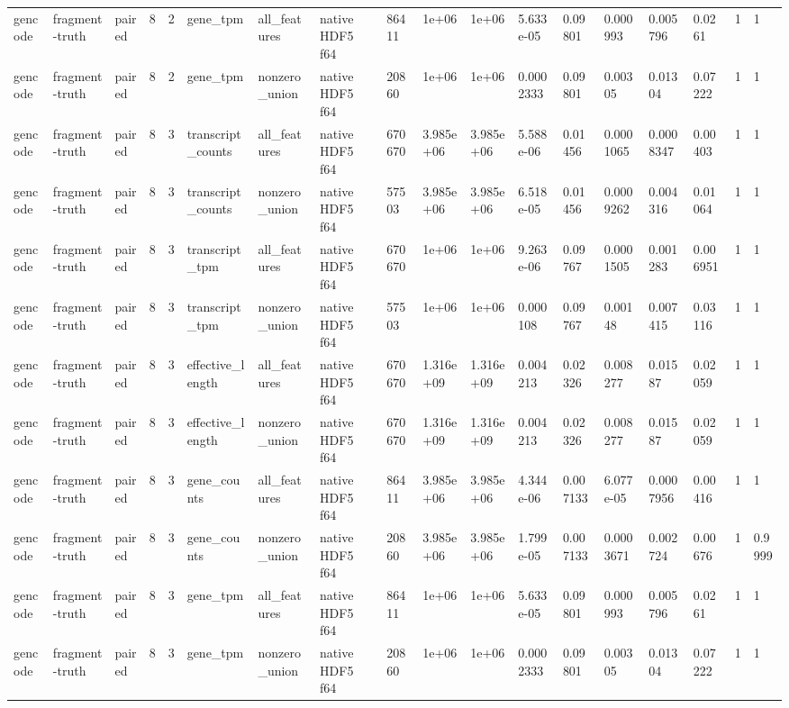 \begin{tabular}{llllllllllllllllll}
gencode & fragment-truth & paired & 8 & 2 & gene\_tpm & all\_features & native HDF5 f64 & 86411 & 1e+06 & 1e+06 & 5.633e-05 & 0.09801 & 0.000993 & 0.005796 & 0.0261 & 1 & 1 \\
gencode & fragment-truth & paired & 8 & 2 & gene\_tpm & nonzero\_union & native HDF5 f64 & 20860 & 1e+06 & 1e+06 & 0.0002333 & 0.09801 & 0.00305 & 0.01304 & 0.07222 & 1 & 1 \\
gencode & fragment-truth & paired & 8 & 3 & transcript\_counts & all\_features & native HDF5 f64 & 670670 & 3.985e+06 & 3.985e+06 & 5.588e-06 & 0.01456 & 0.0001065 & 0.0008347 & 0.00403 & 1 & 1 \\
gencode & fragment-truth & paired & 8 & 3 & transcript\_counts & nonzero\_union & native HDF5 f64 & 57503 & 3.985e+06 & 3.985e+06 & 6.518e-05 & 0.01456 & 0.0009262 & 0.004316 & 0.01064 & 1 & 1 \\
gencode & fragment-truth & paired & 8 & 3 & transcript\_tpm & all\_features & native HDF5 f64 & 670670 & 1e+06 & 1e+06 & 9.263e-06 & 0.09767 & 0.0001505 & 0.001283 & 0.006951 & 1 & 1 \\
gencode & fragment-truth & paired & 8 & 3 & transcript\_tpm & nonzero\_union & native HDF5 f64 & 57503 & 1e+06 & 1e+06 & 0.000108 & 0.09767 & 0.00148 & 0.007415 & 0.03116 & 1 & 1 \\
gencode & fragment-truth & paired & 8 & 3 & effective\_length & all\_features & native HDF5 f64 & 670670 & 1.316e+09 & 1.316e+09 & 0.004213 & 0.02326 & 0.008277 & 0.01587 & 0.02059 & 1 & 1 \\
gencode & fragment-truth & paired & 8 & 3 & effective\_length & nonzero\_union & native HDF5 f64 & 670670 & 1.316e+09 & 1.316e+09 & 0.004213 & 0.02326 & 0.008277 & 0.01587 & 0.02059 & 1 & 1 \\
gencode & fragment-truth & paired & 8 & 3 & gene\_counts & all\_features & native HDF5 f64 & 86411 & 3.985e+06 & 3.985e+06 & 4.344e-06 & 0.007133 & 6.077e-05 & 0.0007956 & 0.00416 & 1 & 1 \\
gencode & fragment-truth & paired & 8 & 3 & gene\_counts & nonzero\_union & native HDF5 f64 & 20860 & 3.985e+06 & 3.985e+06 & 1.799e-05 & 0.007133 & 0.0003671 & 0.002724 & 0.00676 & 1 & 0.9999 \\
gencode & fragment-truth & paired & 8 & 3 & gene\_tpm & all\_features & native HDF5 f64 & 86411 & 1e+06 & 1e+06 & 5.633e-05 & 0.09801 & 0.000993 & 0.005796 & 0.0261 & 1 & 1 \\
gencode & fragment-truth & paired & 8 & 3 & gene\_tpm & nonzero\_union & native HDF5 f64 & 20860 & 1e+06 & 1e+06 & 0.0002333 & 0.09801 & 0.00305 & 0.01304 & 0.07222 & 1 & 1 \\

\end{tabular}
